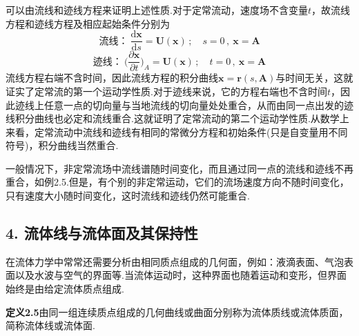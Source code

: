 可以由流线和迹线方程来证明上述性质.对于定常流动，速度场不含变量$t$，故流线方程和迹线方程及相应起始条件分别为
\[
\text{流线：}\ \frac{\mathrm{d}\boldsymbol{x}}{\mathrm{d}s}=\boldsymbol{U}(\boldsymbol{x})\,;\quad s=0\,,\ \boldsymbol{x}=\boldsymbol{A}
\]
\[
\text{迹线：}\ \Big(\frac{\partial\boldsymbol{x}}{\partial t}\Big)_{\!A}=\boldsymbol{U}(\boldsymbol{x})\,;\quad t=0\,,\ \boldsymbol{x}=\boldsymbol{A}
\]
流线方程右端不含时间，因此流线方程的积分曲线$\boldsymbol{x}=\boldsymbol{r}(s,\boldsymbol{A})$与时间无关，这就证实了定常流的第一个运动学性质.对于迹线来说，它的方程右端也不含时间$t$，因此迹线上任意一点的切向量与当地流线的切向量处处重合，从而由同一点出发的迹线积分曲线也必定和流线重合.这就证明了定常流动的第二个运动学性质.从数学上来看，定常流动中流线和迹线有相同的常微分方程和初始条件(只是自变量用不同符号)，积分曲线当然重合.

一般情况下，非定常流场中流线谱随时间变化，而且通过同一点的流线和迹线不再重合，如例2.5.但是，有个别的非定常运动，它们的流场速度方向不随时间变化，只有速度大小随时间变化，这时流线和迹线仍然可能重合.

\subsection*{4. 流体线与流体面及其保持性}

在流体力学中常常还需要分析由相同质点组成的几何面，例如：液滴表面、气泡表面以及水波与空气的界面等.当流体运动时，这种界面也随着运动和变形，但界面始终是由给定流体质点组成.

\noindent\textbf{定义2.5}\quad 由同一组连续质点组成的几何曲线或曲面分别称为流体质线或流体质面，简称流体线或流体面.

